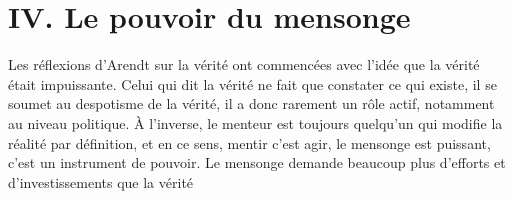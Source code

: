 \documentclass[12pt]{article}
\begin{document}
\section*{\color{red}IV. Le pouvoir du mensonge}
Les réflexions d'Arendt sur la vérité ont commencées avec l'idée que la vérité était impuissante.
Celui qui dit la vérité ne fait que constater ce qui existe, il se soumet au despotisme de la vérité, il a donc rarement un rôle actif, notamment au niveau politique.
À l'inverse, le menteur est toujours quelqu'un qui modifie la réalité par définition, et en ce sens, mentir c'est agir, le mensonge est puissant, c'est un instrument de pouvoir.
Le mensonge demande beaucoup plus d'efforts et d'investissements que la vérité
\end{document}
